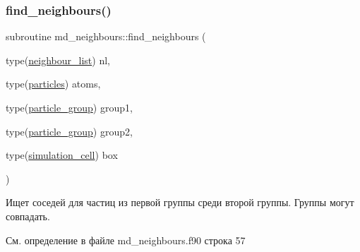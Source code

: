 \subsubsection{\texorpdfstring{find\+\_\+neighbours()}{find\_neighbours()}}
{\footnotesize\ttfamily subroutine md\+\_\+neighbours\+::find\+\_\+neighbours (\begin{DoxyParamCaption}\item[{type(\mbox{\hyperlink{structmd__general_1_1neighbour__list}{neighbour\+\_\+list}})}]{nl,  }\item[{type(\mbox{\hyperlink{structmd__general_1_1particles}{particles}})}]{atoms,  }\item[{type(\mbox{\hyperlink{structmd__general_1_1particle__group}{particle\+\_\+group}})}]{group1,  }\item[{type(\mbox{\hyperlink{structmd__general_1_1particle__group}{particle\+\_\+group}})}]{group2,  }\item[{type(\mbox{\hyperlink{structmd__general_1_1simulation__cell}{simulation\+\_\+cell}})}]{box }\end{DoxyParamCaption})}



Ищет соседей для частиц из первой группы среди второй группы.  Группы могут совпадать. 



См. определение в файле md\+\_\+neighbours.\+f90 строка 57


